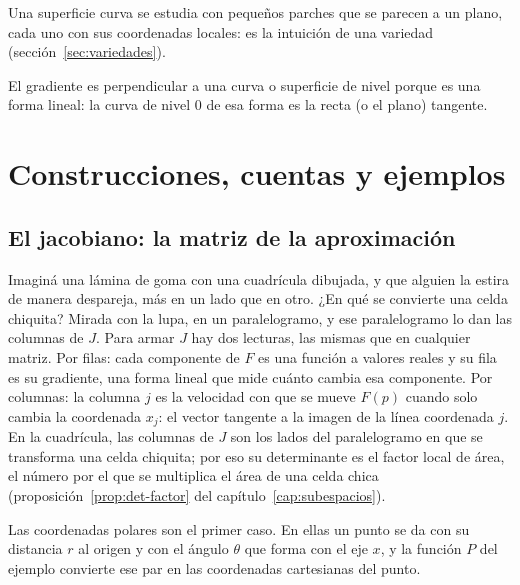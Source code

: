 \begin{idea}
Una superficie curva se estudia con pequeños parches que se parecen a un plano, cada uno con
sus coordenadas locales: es la intuición de una variedad (sección~\ref{sec:variedades}).
\end{idea}

\begin{idea}
El gradiente es perpendicular a una curva o superficie de nivel porque es una forma lineal: la
curva de nivel \(0\) de esa forma es la recta (o el plano) tangente.
\end{idea}

\section{Construcciones, cuentas y ejemplos}


\subsection{El jacobiano: la matriz de la aproximación}\label{sec:jacobiano}

Imaginá una lámina de goma con una cuadrícula dibujada, y que alguien la estira de manera
despareja, más en un lado que en otro. ¿En qué se convierte una celda chiquita? Mirada con la
lupa, en un paralelogramo, y ese paralelogramo lo dan las columnas de \(J\). Para armar \(J\)
hay dos lecturas, las mismas que en cualquier matriz. Por filas: cada componente de \(F\) es una
función a valores reales y su fila es su gradiente, una forma lineal que mide cuánto cambia esa
componente. Por columnas: la columna \(j\) es la velocidad con que se mueve \(F(p)\) cuando solo
cambia la coordenada \(x_j\): el vector tangente a la imagen de la línea coordenada \(j\). En la
cuadrícula, las columnas de \(J\) son los lados del paralelogramo en que se transforma una celda
chiquita; por eso su determinante es el factor local de área, el número por el que se
multiplica el área de una celda chica (proposición~\ref{prop:det-factor} del
capítulo~\ref{cap:subespacios}).

Las coordenadas polares son el primer caso. En ellas un punto se da con su distancia \(r\) al
origen y con el ángulo \(\theta\) que forma con el eje \(x\), y la función \(P\) del ejemplo
convierte ese par en las coordenadas cartesianas del punto.

